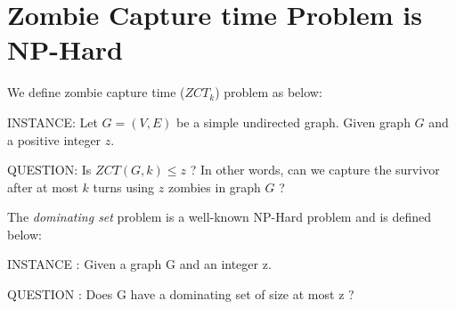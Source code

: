 \documentclass[1p]{elsarticle}
\begin{document}
\section{Zombie Capture time Problem is NP-Hard}\label{np-capturetime}
	We define zombie capture time ($ZCT_k$) problem as below:


	INSTANCE: Let $G = (V,E)$ be a simple undirected graph. Given graph $G$ and a positive integer $z$.


	QUESTION: Is $ZCT(G,k) \leq z$ ? In other words, can we capture the survivor after at most $k$ turns using $z$ zombies in graph $G$ ?

	The {\it dominating set} problem is a well-known NP-Hard problem and is defined below:

	INSTANCE : Given a graph G and an integer z.

	QUESTION : Does G have a dominating set of size at most z ?
\end{document}
